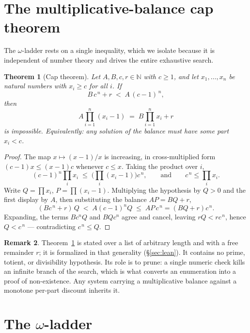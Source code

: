 \documentclass[11pt,reqno]{amsart}
\theoremstyle{plain}
\newtheorem{theorem}{Theorem}[section]
\theoremstyle{definition}
\newtheorem{remark}[theorem]{Remark}
\newcommand{\N}{\mathbb{N}}
\begin{document}
\section{The multiplicative-balance cap theorem}\label{sec:cap}

The $\omega$-ladder rests on a single inequality, which we isolate because it is independent of
number theory and drives the entire exhaustive search.

\begin{theorem}[Cap theorem]\label{thm:cap}
Let $A,B,c,r\in\N$ with $c\ge1$, and let $x_1,\dots,x_n$ be natural numbers with $x_i\ge c$ for
all $i$. If
\[
  B\,c^{\,n}+r \;<\; A\,(c-1)^{\,n},
\]
then
\[
  A\prod_{i=1}^{n}(x_i-1)\;=\;B\prod_{i=1}^{n}x_i+r
\]
is impossible. Equivalently: any solution of the balance must have some part $x_i<c$.
\end{theorem}

\begin{proof}
The map $x\mapsto (x-1)/x$ is increasing, in cross-multiplied form $(c-1)x\le(x-1)c$ whenever
$c\le x$. Taking the product over $i$,
\[
  (c-1)^n\prod_i x_i \;\le\; \Big(\prod_i (x_i-1)\Big)c^{\,n},
  \qquad\text{and}\qquad c^{\,n}\le\prod_i x_i .
\]
Write $Q=\prod x_i$, $P=\prod(x_i-1)$. Multiplying the hypothesis by $Q>0$ and the first
display by $A$, then substituting the balance $AP=BQ+r$,
\[
  (Bc^{\,n}+r)\,Q \;<\; A(c-1)^nQ \;\le\; A P\,c^{\,n}=(BQ+r)c^{\,n}.
\]
Expanding, the terms $Bc^nQ$ and $BQc^n$ agree and cancel, leaving $rQ<rc^{\,n}$, hence
$Q<c^{\,n}$ --- contradicting $c^{\,n}\le Q$.
\end{proof}

\begin{remark}
Theorem~\ref{thm:cap} is stated over a list of arbitrary length and with a free remainder $r$;
it is formalized in that generality (\S\ref{sec:lean}). It contains no prime, totient, or
divisibility hypothesis. Its role is to prune: a single numeric check kills an infinite branch
of the search, which is what converts an enumeration into a proof of non-existence. Any system
carrying a multiplicative balance against a monotone per-part discount inherits it.
\end{remark}

\section{The \texorpdfstring{$\omega$}{omega}-ladder}\label{sec:omega}
\end{document}
